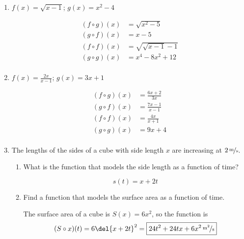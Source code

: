 \documentclass{exam}
\begin{document}
  \begin{enumerate}


    \item $f(x) = \sqrt{x - 1}$; $g(x) = x^2 - 4$
      \begin{solution}
        \begin{align*}
          (f \circ g)(x) &= \sqrt{x^2 - 5} \\
          (g \circ f)(x) &= x - 5 \\
          (f \circ f)(x) &= \sqrt{\sqrt{x - 1} - 1} \\
          (g \circ g)(x) &= x^4 - 8x^2 + 12 \\
        \end{align*}
      \end{solution}

    \item $f(x) = \frac{2x}{x - 1}$; $g(x) = 3x + 1$
      \begin{solution}
        \begin{align*}
          (f \circ g)(x) &= \frac{6x + 2}{3x} \\
          (g \circ f)(x) &= \frac{7x - 1}{x - 1} \\
          (f \circ f)(x) &= \frac{4x}{x + 1} \\
          (g \circ g)(x) &= 9x + 4 \\
        \end{align*}
      \end{solution}

    \ifprintanswers{}
      \pagebreak
    \fi

    \item 
      The lengths of the sides of a cube with side length $x$ are increasing at $\unitfrac[2]{m}{s}$.

      \begin{enumerate}[a]
        \item What is the function that models the side length as a function of time?
          \begin{solution}
            \[ \boxed{s(t) = x + 2t} \]
          \end{solution}

        \item Find a function that models the surface area as a function of time.
          \begin{solution}
              The surface area of a cube is $S(x) = 6x^2$, so the function is 
              \[
                (S \circ x)(t) = 6 \del{x + 2t}^2 = \boxed{\unitfrac[24t^2 + 24tx + 6x^2]{m^2}{s}}
              \]
          \end{solution}


\end{enumerate}
\end{enumerate}
\end{document}
